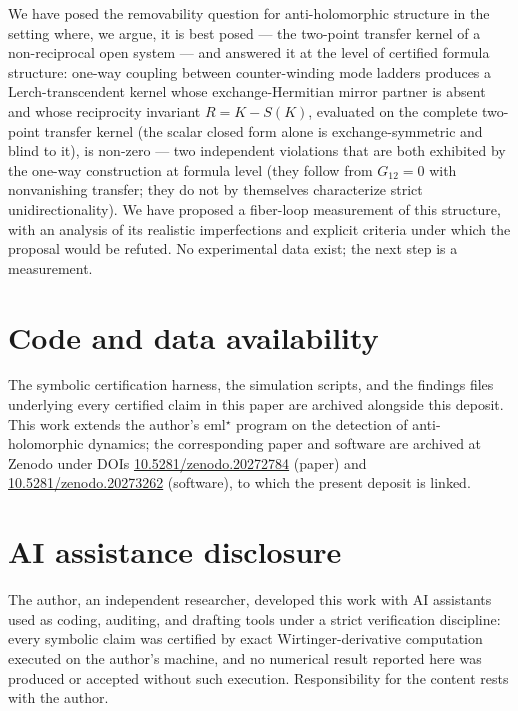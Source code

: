\documentclass[11pt,a4paper]{article}
\begin{document}
We have posed the removability question for anti-holomorphic structure in the
setting where, we argue, it is best posed --- the two-point transfer kernel of
a non-reciprocal open system --- and answered it at the level of certified
formula structure: one-way coupling between counter-winding mode ladders
produces a Lerch-transcendent kernel whose exchange-Hermitian mirror partner
is absent and whose reciprocity invariant $R = K - S(K)$, evaluated on the
complete two-point transfer kernel (the scalar closed form alone is
exchange-symmetric and blind to it), is non-zero --- two independent
violations that are both exhibited by the one-way construction at formula
level (they follow from $G_{12} = 0$ with nonvanishing transfer; they do not
by themselves characterize strict unidirectionality).
We have proposed a fiber-loop measurement of this structure, with an analysis
of its realistic imperfections and explicit criteria under which the proposal
would be refuted. No experimental data exist; the next step is a measurement.

\section*{Code and data availability}

The symbolic certification harness, the simulation scripts, and the findings
files underlying every certified claim in this paper are archived alongside
this deposit. This work extends the author's eml$^\star$ program on the
detection of anti-holomorphic dynamics; the corresponding paper and software
are archived at Zenodo under DOIs \href{https://doi.org/10.5281/zenodo.20272784}{10.5281/zenodo.20272784}
(paper) and \href{https://doi.org/10.5281/zenodo.20273262}{10.5281/zenodo.20273262}
(software), to which the present deposit is linked.

\section*{AI assistance disclosure}

The author, an independent researcher, developed this work with AI assistants
used as coding, auditing, and drafting tools under a strict verification
discipline: every symbolic claim was certified by exact Wirtinger-derivative
computation executed on the author's machine, and no numerical result reported
here was produced or accepted without such execution. Responsibility for the
content rests with the author.
\end{document}
